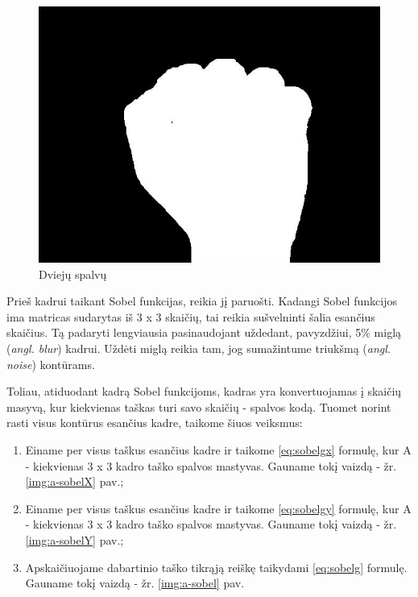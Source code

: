\documentclass{VUMIFInfKursinis}
\begin{document}
\begin{figure}[H]
	\begin{minipage}{.3\textwidth}
		\centering
		\includegraphics[width=.8\linewidth]{img/A-white}
		\caption{Dviejų spalvų}
		\label{img:a-white-sign}
	\end{minipage}
\end{figure}

Prieš kadrui taikant Sobel funkcijas, reikia jį paruošti. Kadangi Sobel funkcijos ima matricas sudarytas iš 3 x 3 skaičių, tai reikia sušvelninti šalia esančius skaičius. Tą padaryti lengviausia pasinaudojant uždedant, pavyzdžiui, 5\% miglą (\textit{angl. blur}) kadrui. Uždėti miglą reikia tam, jog sumažintume triukšmą (\textit{angl. noise}) kontūrams. 

Toliau, atiduodant kadrą Sobel funkcijoms, kadras yra konvertuojamas į skaičių masyvą, kur kiekvienas taškas turi savo skaičių - spalvos kodą. Tuomet norint rasti visus kontūrus esančius kadre, taikome šiuos veiksmus:

\begin{enumerate}
	\item Einame per visus taškus esančius kadre ir taikome \ref{eq:sobelgx} formulę, kur A - kiekvienas 3 x 3 kadro taško spalvos mastyvas. Gauname tokį vaizdą - žr. \ref{img:a-sobelX} pav.;
	\item Einame per visus taškus esančius kadre ir taikome \ref{eq:sobelgy} formulę, kur A - kiekvienas 3 x 3 kadro taško spalvos mastyvas. Gauname tokį vaizdą - žr. \ref{img:a-sobelY} pav.;
	\item Apskaičiuojame dabartinio taško tikrąją reiškę taikydami \ref{eq:sobelg} formulę. Gauname tokį vaizdą - žr. \ref{img:a-sobel} pav.
\end{enumerate}
\end{document}
